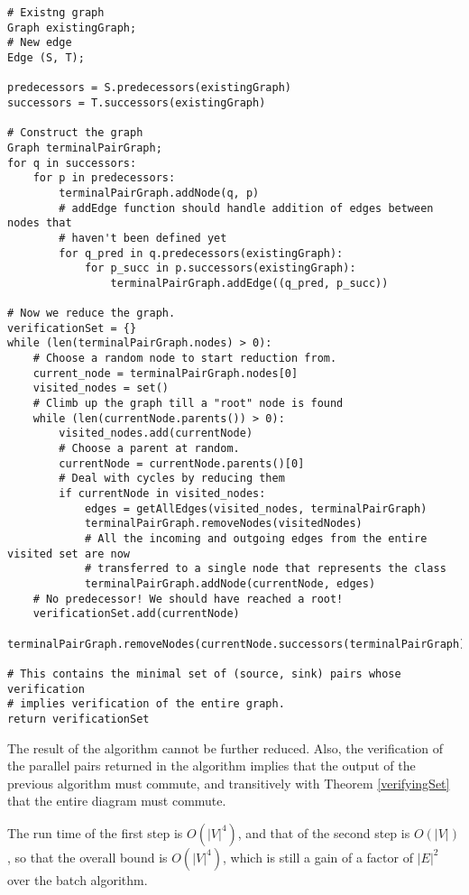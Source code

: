 \documentclass[runningheads]{llncs}
\begin{document}
\begin{verbatim}
# Existng graph
Graph existingGraph;
# New edge
Edge (S, T);

predecessors = S.predecessors(existingGraph)
successors = T.successors(existingGraph)

# Construct the graph
Graph terminalPairGraph;
for q in successors:
    for p in predecessors:
        terminalPairGraph.addNode(q, p)
        # addEdge function should handle addition of edges between nodes that 
        # haven't been defined yet
        for q_pred in q.predecessors(existingGraph):
            for p_succ in p.successors(existingGraph):
                terminalPairGraph.addEdge((q_pred, p_succ))

# Now we reduce the graph.
verificationSet = {}
while (len(terminalPairGraph.nodes) > 0):
    # Choose a random node to start reduction from.
    current_node = terminalPairGraph.nodes[0]
    visited_nodes = set()
    # Climb up the graph till a "root" node is found
    while (len(currentNode.parents()) > 0):
        visited_nodes.add(currentNode)
        # Choose a parent at random.
        currentNode = currentNode.parents()[0]
        # Deal with cycles by reducing them
        if currentNode in visited_nodes:
            edges = getAllEdges(visited_nodes, terminalPairGraph)
            terminalPairGraph.removeNodes(visitedNodes)
            # All the incoming and outgoing edges from the entire visited set are now 
            # transferred to a single node that represents the class
            terminalPairGraph.addNode(currentNode, edges)
    # No predecessor! We should have reached a root!
    verificationSet.add(currentNode)
    terminalPairGraph.removeNodes(currentNode.successors(terminalPairGraph)

# This contains the minimal set of (source, sink) pairs whose verification 
# implies verification of the entire graph. 
return verificationSet

\end{verbatim}

The result of the algorithm cannot be further reduced. Also, the verification of the parallel pairs returned in the algorithm implies that the output of the previous algorithm must commute, and transitively with Theorem \ref{verifyingSet} that the entire diagram must commute.

The run time of the first step is $O(|V|^4)$, and that of the second step is $O(|V|)$, so that the overall bound is $O(|V|^4)$, which is still a gain of a factor of $|E|^2$ over the batch algorithm.
\end{document}
